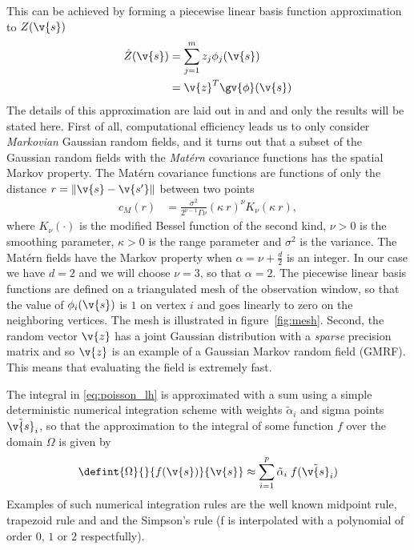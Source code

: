 \documentclass[12pt,a4paper,oneside,article]{memoir}
\begin{document}
This can be achieved by forming a piecewise linear basis function approximation to $Z(\v{s})$
\begin{align}
	\hat{Z}(\v{s})&=\sum_{j=1}^m z_j\phi_j(\v{s})\\
	&=\v{z}^T\gv{\phi}(\v{s})
	\label{eq:field_approximation}
\end{align}
The details of this approximation are laid out in \cite{Lindgren2010} and \cite{Simpson2011a} 
and only the results will be stated here. First of all, computational efficiency leads us to only consider
\emph{Markovian} Gaussian random fields, and it turns out that a subset of the Gaussian random fields
with the \emph{Matérn} covariance functions has the spatial Markov property. 
The Matérn covariance functions are functions of only the distance $r=\|\v{s}-\v{s'}\|$
between two points
\begin{align}
	c_M(r)&=\frac{\sigma^2}{2^{\nu-1}\Gamma{\nu}}(\kappa\:r)^{\nu} K_{\nu}(\kappa\:r),
	\label{eq:matern}
\end{align}
where $K_{\nu}(\cdot)$ is the modified Bessel function of the second kind, $\nu>0$ is 
the smoothing parameter, $\kappa > 0$ is the range parameter and $\sigma^2$ is the variance.
The Matérn fields have the Markov property when $\alpha=\nu+\frac{d}{2}$ is an integer. In our case
we have $d=2$ and we will choose $\nu=3$, so that $\alpha=2$. The piecewise linear basis functions
are defined on a triangulated mesh of the observation window, so that the value of
$\phi_i(\v{s})$ is $1$ on vertex $i$ and goes linearly to zero on the neighboring vertices.
The mesh is illustrated in figure~\ref{fig:mesh}. Second, the random vector $\v{z}$ has
a joint Gaussian distribution with a \emph{sparse} precision matrix and so
$\v{z}$ is an example of a Gaussian Markov random field (GMRF). This means that
evaluating the field is extremely fast.

The integral in \eqref{eq:poisson_lh} is approximated with a sum using a simple
deterministic numerical integration scheme with weights $\tilde{\alpha}_i$ and sigma
points $\tilde{\v{s}}_i$, so that the approximation to the integral of some function $f$
over the domain $\Omega$ is given by
\begin{align}
	\defint{\Omega}{}{f(\v{s})}{\v{s}}\approx \sum_{i=1}^p \tilde{\alpha}_i\;f(\tilde{\v{s}}_i)
	\label{eq:integ_approx_general}
\end{align}
Examples of such numerical integration rules are the well known midpoint rule, trapezoid rule and 
and the Simpson's rule (f is interpolated with a polynomial of order $0$, $1$ or $2$ respectfully).
\end{document}
